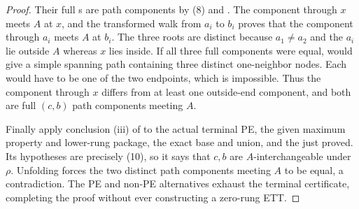 \begin{proof}
Their full s are path components by (8) and
.  The component through $x$ meets $A$ at
$x$, and the transformed walk from $a_i$ to $b_i$ proves that the
component through $a_i$ meets $A$ at $b_i$.  The three roots are distinct
because $a_1\ne a_2$ and the $a_i$ lie outside $A$ whereas $x$ lies
inside.  If all three full components were equal,
 would give a simple spanning path
containing three distinct one-neighbor nodes.  Each would have to be one
of the two endpoints, which is impossible.  Thus the component through
$x$ differs from at least one outside-end component, and both are full
$(c,b)$ path components meeting $A$.

Finally apply conclusion (iii) of  to the actual
terminal PE, the given maximum property and lower-rung package, the exact
base and union, and the  just proved.
Its hypotheses are precisely (10), so it says that $c,b$ are
$A$-interchangeable under $\rho$.  Unfolding
 forces the two distinct path components
meeting $A$ to be equal, a contradiction.  The PE and non-PE alternatives
exhaust the terminal certificate, completing the proof without ever
constructing a zero-rung ETT.
\end{proof}
